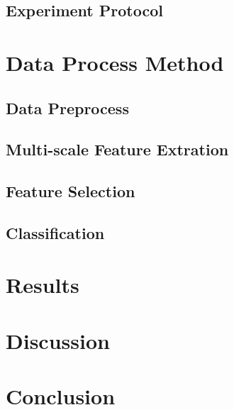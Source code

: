 \documentclass[runningheads,a4paper]{llncs}
\begin{document}
\subsection{Experiment Protocol}


\section{Data Process Method}

\subsection{Data Preprocess}
\subsection{Multi-scale Feature Extration}
\subsection{Feature Selection}
\subsection{Classification}

\section{Results}

\section{Discussion}

\section{Conclusion}
\end{document}
